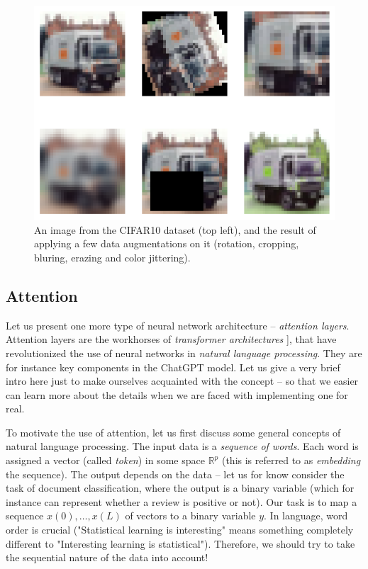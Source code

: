 \documentclass{article}
\newcommand{\R}{\mathbb{R}}
\begin{document}
\begin{figure}
    \centering
    \includegraphics[width=0.65\linewidth]{graphics/augmentation.png}
    \caption{An image from the CIFAR10 dataset (top left), and the result of applying a few data augmentations on it (rotation, cropping, bluring, erazing and color jittering).}
    \label{fig:augment}
\end{figure}

\subsection{Attention}
Let us present one more type of neural network architecture -- \emph{attention layers}. Attention layers are the workhorses of \emph{transformer architectures} \cite{vaswani2017attention}], that have revolutionized the use of neural networks in \emph{natural language processing}. They are for instance key components in the ChatGPT model. Let us give a very brief intro here just to make ourselves acquainted with the concept -- so that we easier can learn more about the details when we are faced with implementing one for real.

To motivate the use of attention, let us first discuss some general concepts of natural language processing. The input data is a \emph{sequence of words}. Each word is assigned a vector (called \emph{token}) in some space $\R^p$ (this is referred to as \emph{embedding} the sequence). The output depends on the data -- let us for know consider the task of document classification, where the output is a binary variable (which for instance can represent whether a review is positive or not). Our task is to map a sequence $x(0), \dots, x(L)$ of vectors to a binary variable $y$. In language, word order is crucial ("Statistical learning is interesting" means something completely different to "Interesting learning is statistical"). Therefore, we should try to take the sequential nature of the data into account!
\end{document}
